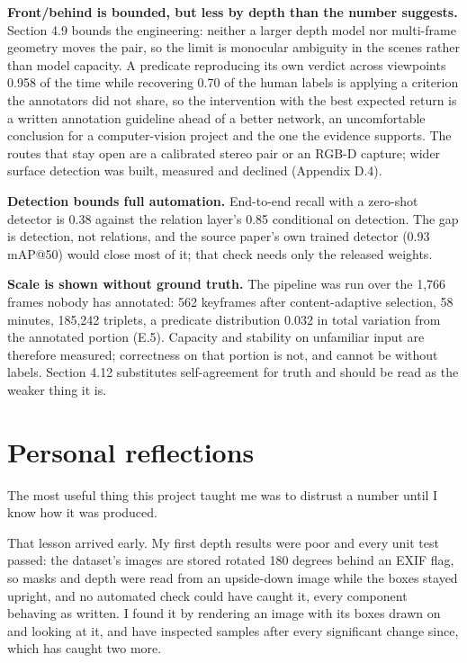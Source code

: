 \textbf{Front/behind is bounded, but less by depth than the number suggests.} Section 4.9 bounds the engineering: neither a larger depth model nor multi-frame geometry moves the pair, so the limit is monocular ambiguity in the scenes rather than model capacity. A predicate reproducing its own verdict across viewpoints 0.958 of the time while recovering 0.70 of the human labels is applying a criterion the annotators did not share, so the intervention with the best expected return is a written annotation guideline ahead of a better network, an uncomfortable conclusion for a computer-vision project and the one the evidence supports. The routes that stay open are a calibrated stereo pair or an RGB-D capture; wider surface detection was built, measured and declined (Appendix D.4).

\textbf{Detection bounds full automation.} End-to-end recall with a zero-shot detector is 0.38 against the relation layer's 0.85 conditional on detection. The gap is detection, not relations, and the source paper's own trained detector (0.93 mAP@50) would close most of it; that check needs only the released weights.

\textbf{Scale is shown without ground truth.} The pipeline was run over the 1,766 frames nobody has annotated: 562 keyframes after content-adaptive selection, 58 minutes, 185,242 triplets, a predicate distribution 0.032 in total variation from the annotated portion (E.5). Capacity and stability on unfamiliar input are therefore measured; correctness on that portion is not, and cannot be without labels. Section 4.12 substitutes self-agreement for truth and should be read as the weaker thing it is.

\section{Personal reflections}

The most useful thing this project taught me was to distrust a number until I know how it was produced.

That lesson arrived early. My first depth results were poor and every unit test passed: the dataset's images are stored rotated 180 degrees behind an EXIF flag, so masks and depth were read from an upside-down image while the boxes stayed upright, and no automated check could have caught it, every component behaving as written. I found it by rendering an image with its boxes drawn on and looking at it, and have inspected samples after every significant change since, which has caught two more.

